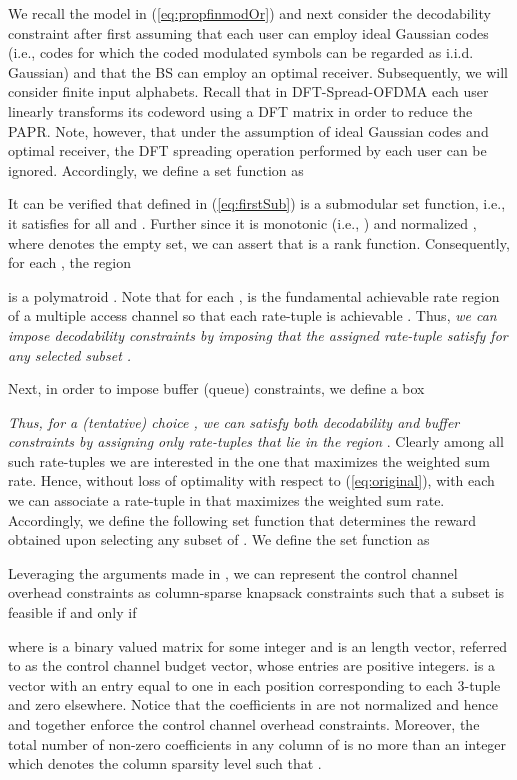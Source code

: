 \documentclass[11pt] {article}
\begin{document}
We recall the model in (\ref{eq:propfinmodOr}) and next consider the decodability constraint after first assuming that each user can employ ideal Gaussian codes (i.e., codes for which the coded modulated symbols can be regarded as i.i.d. Gaussian) and that the BS can employ an optimal receiver. Subsequently, we will consider finite input alphabets. Recall that in DFT-Spread-OFDMA each user linearly transforms its codeword using a DFT matrix in order to reduce the PAPR. Note, however,  that under the assumption of ideal Gaussian codes  and optimal receiver, the DFT spreading operation performed by each user can be ignored.  Accordingly, we define a set function  as

It can be verified that  defined in (\ref{eq:firstSub}) is a submodular set function, i.e., it satisfies 
 for all  and .
Further since it is monotonic (i.e., ) and normalized , where  denotes the empty set, we can assert that   is a rank function. Consequently,
for each , the region
  
is a polymatroid \cite{edmonds:poly}. Note that for   each ,   is the fundamental achievable rate region of a  multiple access channel so that each rate-tuple  is achievable \cite{tse:poly}. Thus, {\em we can impose decodability constraints by imposing that the assigned rate-tuple satisfy  for any selected subset .}

Next, in order to impose buffer (queue) constraints, we define a box
 
{\em Thus, for a (tentative) choice , we can satisfy both decodability and buffer constraints by assigning only rate-tuples that lie in the region  }.
Clearly among all such rate-tuples we are interested in the one that maximizes the weighted sum rate. Hence, without loss of optimality with respect to (\ref{eq:original}), with each  we can associate a rate-tuple in  that maximizes the weighted sum rate. Accordingly, we define the following set function that determines the reward obtained upon selecting any subset of  .
We define the set function  as
 




  Leveraging  the arguments made in  \cite{prasad:wiopt12}, we can  represent the control channel overhead constraints as column-sparse knapsack constraints
 such that a subset  is feasible if and only if
 
 where  is a binary valued matrix for some integer  and  is an  length vector, referred to as the control channel budget vector,  whose entries are positive integers.  is a vector with an entry equal to one in each position corresponding to each 3-tuple  and zero elsewhere.
 Notice that the coefficients in  are not normalized and hence  and  together enforce the control channel overhead constraints. Moreover, the total number of non-zero coefficients in any column of  is no more than  an integer  which denotes the column sparsity level such that .
\end{document}
